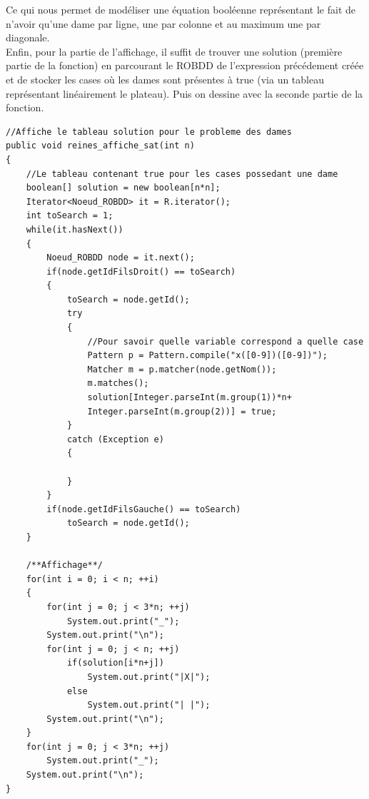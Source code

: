 \documentclass{article}
\begin{document}
Ce qui nous permet de modéliser une équation booléenne représentant le fait de n'avoir qu'une dame par ligne, une par colonne et au maximum une par diagonale.\\
Enfin, pour la partie de l'affichage, il suffit de trouver une solution (première partie de la fonction) en parcourant le ROBDD de l'expression précédement créée et de stocker les cases où les dames sont présentes à true (via un tableau représentant linéairement le plateau). Puis on dessine avec la seconde partie de la fonction.
\begin{verbatim}
//Affiche le tableau solution pour le probleme des dames
public void reines_affiche_sat(int n)
{
	//Le tableau contenant true pour les cases possedant une dame
	boolean[] solution = new boolean[n*n];
	Iterator<Noeud_ROBDD> it = R.iterator();
	int toSearch = 1;
	while(it.hasNext())
	{
		Noeud_ROBDD node = it.next();
		if(node.getIdFilsDroit() == toSearch)
		{
			toSearch = node.getId();
			try
			{
				//Pour savoir quelle variable correspond a quelle case
				Pattern p = Pattern.compile("x([0-9])([0-9])");
				Matcher m = p.matcher(node.getNom());
				m.matches();
				solution[Integer.parseInt(m.group(1))*n+
				Integer.parseInt(m.group(2))] = true;
			}
			catch (Exception e)
			{
			
			}
		}
		if(node.getIdFilsGauche() == toSearch)
			toSearch = node.getId();
	}
	
	/**Affichage**/
	for(int i = 0; i < n; ++i)
	{
		for(int j = 0; j < 3*n; ++j)
			System.out.print("_");
		System.out.print("\n");
		for(int j = 0; j < n; ++j)
			if(solution[i*n+j])
				System.out.print("|X|");
			else
				System.out.print("| |");
		System.out.print("\n");
	}
	for(int j = 0; j < 3*n; ++j)
		System.out.print("_");
	System.out.print("\n");
}
\end{verbatim}
\end{document}
